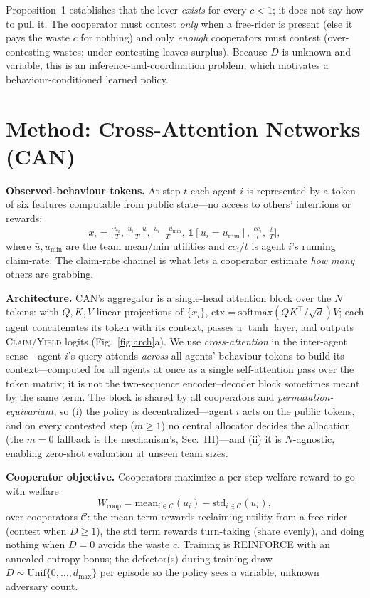 \documentclass[conference, a4paper]{IEEEtran}
\begin{document}
\noindent Proposition~1 establishes that the lever \emph{exists} for every $c<1$;
it does not say how to pull it. The cooperator must contest \emph{only} when a
free-rider is present (else it pays the waste $c$ for nothing) and only \emph{enough}
cooperators must contest (over-contesting wastes; under-contesting leaves surplus).
Because $D$ is unknown and variable, this is an inference-and-coordination problem,
which motivates a behaviour-conditioned learned policy.

\section{Method: Cross-Attention Networks (CAN)}
\textbf{Observed-behaviour tokens.} At step $t$ each agent $i$ is represented by a
token of six features computable from public state---no access to others'
intentions or rewards:
\begin{equation}
\textstyle
x_i=\Big[\tfrac{u_i}{T},\,\tfrac{u_i-\bar u}{T},\,\tfrac{u_i-u_{\min}}{T},\,
\mathbf 1[u_i{=}u_{\min}],\,\tfrac{c\!c_i}{t},\,\tfrac{t}{T}\Big],
\end{equation}
where $\bar u,u_{\min}$ are the team mean/min utilities and $cc_i/t$ is agent $i$'s
running claim-rate. The claim-rate channel is what lets a cooperator estimate
\emph{how many} others are grabbing.

\textbf{Architecture.} CAN's aggregator is a single-head attention block over the
$N$ tokens: with $Q,K,V$ linear projections of $\{x_i\}$,
$\mathrm{ctx}=\mathrm{softmax}(QK^\top/\sqrt{d})V$; each agent concatenates its
token with its context, passes a $\tanh$ layer, and outputs
\textsc{Claim}/\textsc{Yield} logits (Fig.~\ref{fig:arch}a). We use
\emph{cross-attention} in the inter-agent sense---agent $i$'s query attends
\emph{across} all agents' behaviour tokens to build its context---computed for all
agents at once as a single self-attention pass over the token matrix; it is not the
two-sequence encoder--decoder block sometimes meant by the same term. The block is shared by
all cooperators and \emph{permutation-equivariant}, so (i) the policy is
decentralized---agent $i$ acts on the public tokens, and on every contested step
($m\ge1$) no central allocator decides the allocation (the $m{=}0$ fallback is the
mechanism's, Sec.~III)---and (ii) it is $N$-agnostic, enabling zero-shot evaluation
at unseen team sizes.

\textbf{Cooperator objective.} Cooperators maximize a per-step welfare reward-to-go
with welfare
\begin{equation}
W_{\mathrm{coop}}=\mathrm{mean}_{i\in\mathcal C}(u_i)-\mathrm{std}_{i\in\mathcal
C}(u_i),
\end{equation}
over cooperators $\mathcal C$: the mean term rewards reclaiming utility from a
free-rider (contest when $D\ge1$), the std term rewards turn-taking (share evenly),
and doing nothing when $D{=}0$ avoids the waste $c$. Training is REINFORCE with an
annealed entropy bonus; the defector(s) during training draw $D\sim\mathrm{Unif}\{0,
\dots,d_{\max}\}$ per episode so the policy sees a variable, unknown adversary
count.
\end{document}
